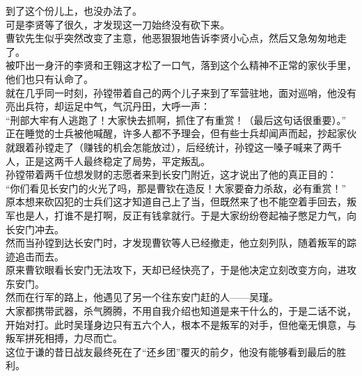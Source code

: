 \begin{multicols}{\theparacolNo}
到了这个份儿上，也没办法了。\\

可是李贤等了很久，才发现这一刀始终没有砍下来。\\

曹钦先生似乎突然改变了主意，他恶狠狠地告诉李贤小心点，然后又急匆匆地走了。\\

被吓出一身汗的李贤和王翱这才松了一口气，落到这个么精神不正常的家伙手里，他们也只有认命了。\\

就在几乎同一时刻，孙镗带着自己的两个儿子来到了军营驻地，面对巡哨，他没有亮出兵符，却运足中气，气沉丹田，大呼一声：\\

“刑部大牢有人逃跑了！大家快去抓啊，抓住了有重赏！（最后这句话很重要）。”\\

正在睡觉的士兵被他喊醒，许多人都不予理会，但有些士兵却闻声而起，抄起家伙就跟着孙镗走了（赚钱的机会怎能放过），后经统计，孙镗这一嗓子喊来了两千人，正是这两千人最终稳定了局势，平定叛乱。\\

孙镗带着两千位想发财的志愿者来到长安门附近，这才说出了他的真正目的：\\

“你们看见长安门的火光了吗，那是曹钦在造反！大家要奋力杀敌，必有重赏！”\\

原本想来砍囚犯的士兵们这才知道自己上了当，但既然来了也不能空着手回去，叛军也是人，打谁不是打啊，反正有钱拿就行。于是大家纷纷卷起袖子憋足力气，向长安门冲去。\\

然而当孙镗到达长安门时，才发现曹钦等人已经撤走，他立刻列队，随着叛军的踪迹追击而去。\\

原来曹钦眼看长安门无法攻下，天却已经快亮了，于是他决定立刻改变方向，进攻东安门。\\

然而在行军的路上，他遇见了另一个往东安门赶的人——吴瑾。\\

大家都携带武器，杀气腾腾，不用自我介绍也知道是来干什么的，于是二话不说，开始对打。此时吴瑾身边只有五六个人，根本不是叛军的对手，但他毫无惧意，与叛军拼死相搏，力尽而亡。\\

这位于谦的昔日战友最终死在了“还乡团”覆灭的前夕，他没有能够看到最后的胜利。\\


\end{multicols}
